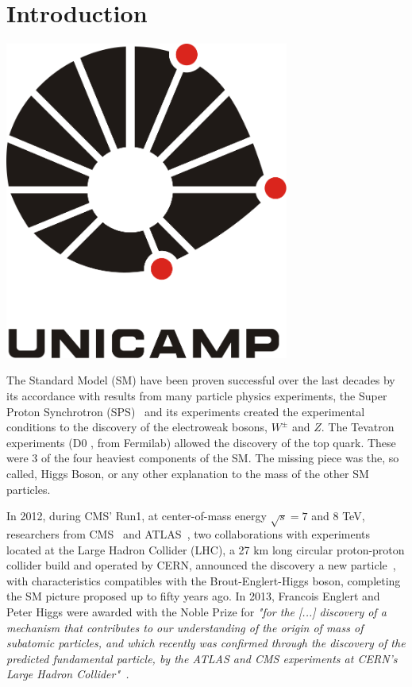 \chapter{Introduction}

\includegraphics[width=0.7\textwidth]{figures_and_tables/logo_unicamp/logo_unicamp}

The Standard Model (SM) have been proven successful over the last decades by its accordance with results from many particle physics experiments, the Super Proton Synchrotron (SPS)~\cite{Synchrotron:1997188} and its experiments created the experimental conditions to the discovery of the electroweak bosons, $W^{\pm}$ and $Z$. The Tevatron experiments (D0 , from Fermilab) allowed the discovery of the top quark. These were 3 of the four heaviest components of the SM. The missing piece was the, so called, Higgs Boson, or any other explanation to the mass of the other SM particles. 

In 2012, during CMS' Run1, at center-of-mass energy $\sqrt{s} = 7$ and $8$ TeV, researchers from CMS~\cite{Chatrchyan:2008zzk} and ATLAS~\cite{atlas_collaboration_2008}, two collaborations with experiments located at the Large Hadron Collider (LHC), a 27 km long circular proton-proton collider build and operated by CERN, announced the discovery a new particle~\cite{higgs_discovery_cms, higgs_discovery_atlas}, with characteristics compatibles with the Brout-Englert-Higgs boson, completing the SM picture proposed up to fifty years ago. In 2013, Francois Englert and Peter Higgs were awarded with the Noble Prize for \textit{"for the [...] discovery of a mechanism that contributes to our understanding of the origin of mass of subatomic particles, and which recently was confirmed through the discovery of the predicted fundamental particle, by the ATLAS and CMS experiments at CERN's Large Hadron Collider"~\cite{noble_prize}.}

